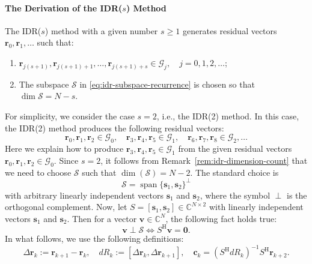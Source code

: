 \paragraph{{The Derivation of the IDR($s$) Method}}\label{subsec:idr-derivation}\mbox{}\par
{The IDR($s$) method with a given number $s\ge1$ generates residual vectors $\bm r_0,\bm r_1,\ldots$ such that:}
\begin{enumerate}
\item $\bm r_{j(s+1)},\bm r_{j(s+1)+1},\ldots,\bm r_{j(s+1)+s}\in\mathcal G_j,\quad j=0,1,2,\ldots$;
\item{The subspace $\mathcal S$ in \eqref{eq:idr-subspace-recurrence} is chosen so that $\dim\mathcal S=N-s$.}
\end{enumerate}
{For simplicity, we consider the case $s=2$, i.e., the IDR(2) method. In this case, the IDR(2) method produces the following residual vectors:}
\[\bm r_0,\bm r_1,\bm r_2\in\mathcal G_0,\quad\bm r_3,\bm r_4,\bm r_5\in\mathcal G_1,\quad\bm r_6,\bm r_7,\bm r_8\in\mathcal G_2,\ldots\]
{Here we explain how to produce $\bm r_3,\bm r_4,\bm r_5\in\mathcal G_1$ from the given residual vectors $\bm r_0,\bm r_1,\bm r_2\in\mathcal G_0$. Since $s=2$, it follows from Remark\ \ref{rem:idr-dimension-count} that we need to choose $\mathcal S$ such that $\dim(\mathcal S)=N-2$. The standard choice is}
\begin{equation}\label{eq:idr-shadow-complement}\mathcal S=\operatorname{span}\{\bm s_1,\bm s_2\}^{\perp}\end{equation}
{with arbitrary linearly independent vectors $\bm s_1$ and $\bm s_2$, where the symbol $\perp$ is the orthogonal complement.}
{Now, let $S=[\bm s_1,\bm s_2]\in\mathbb C^{N\times2}$ with linearly independent vectors $\bm s_1$ and $\bm s_2$. Then for a vector $\bm v\in\mathbb C^N$, the following fact holds true:}
\begin{equation}\label{eq:idr-shadow-orthogonality}\bm v\perp\mathcal S\Leftrightarrow S^{\mathrm H}\bm v=\bm0.\end{equation}
{In what follows, we use the following definitions:}
\begin{equation}\label{eq:idr-residual-differences}\Delta\bm r_k:=\bm r_{k+1}-\bm r_k,\quad dR_k:=[\Delta\bm r_k,\Delta\bm r_{k+1}],\quad\bm c_k=(S^{\mathrm H}dR_k)^{-1}S^{\mathrm H}\bm r_{k+2}.\end{equation}
